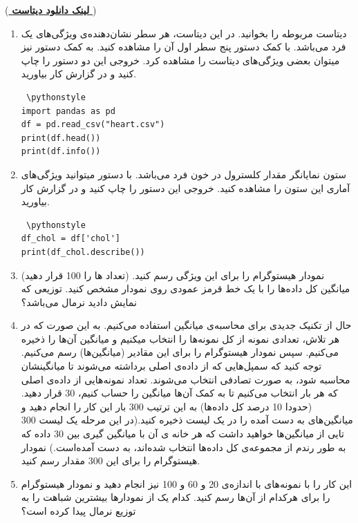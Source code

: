 \documentclass[a4paper]{article}
\begin{document}
(\href{https://drive.google.com/file/d/12Za0y2Xn2-6-b5-XGL5WwF33FZsjRFfq/view?usp=sharing}{ 
 \textbf{	لینک دانلود دیتاست}
})
\begin{enumerate}
	\item 
دیتاست مربوطه را بخوانید.  در این دیتاست، هر سطر نشان‌دهنده‌ی ویژگی‌های یک فرد می‌باشد. با کمک دستور
پنج سطر اول آن را مشاهده کنید. به کمک دستور
نیز میتوان بعضی ویژگی‌های دیتاست را مشاهده کرد. خروجی این دو دستور را چاپ کنید و در گزارش کار بیاورید. 
	\begin{latin}
		\begin{lstlisting} \pythonstyle
import pandas as pd
df = pd.read_csv("heart.csv")
print(df.head())
print(df.info())
		\end{lstlisting}
	\end{latin}
	\item
	ستون
	نمایانگر مقدار کلسترول در خون فرد می‌باشد. با دستور 
	میتوانید ویژگی‌های آماری این ستون را مشاهده کنید. خروجی این دستور را چاپ کنید و در گزارش کار بیاورید.
\begin{latin}
	\begin{lstlisting} \pythonstyle
df_chol = df['chol']
print(df_chol.describe())
	\end{lstlisting}
\end{latin}
\item 
نمودار هیستوگرام را برای این ویژگی رسم کنید. (تعداد 
 ها را  100 قرار دهید) 
میانگین کل داده‌ها را با یک خط قرمز عمودی روی نمودار مشخص کنید. توزیعی که نمایش دادید نرمال می‌باشد؟
\item 
حال از تکنیک جدیدی برای محاسبه‌ی میانگین استفاده می‌کنیم. به این صورت که در هر تلاش، تعدادی نمونه از کل نمونه‌ها را انتخاب میکنیم و میانگین آن‌ها را ذخیره می‌کنیم. سپس نمودار هیستوگرام را برای این مقادیر (میانگین‌ها) رسم می‌کنیم. توجه کنید که سمپل‌هایی که از داده‌ی اصلی برداشته می‌شوند تا میانگینشان محاسبه شود، به صورت تصادفی انتخاب می‌شوند. تعداد نمونه‌هایی از داده‌ی اصلی که هر بار انتخاب می‌کنیم تا به کمک آن‌ها میانگین را حساب کنیم، 30 قرار دهید. (حدودا 10 درصد کل داده‌ها) به این ترتیب  300 بار این کار را انجام دهید و میانگین‌های به دست آمده را در یک لیست ذخیره کنید.(در این مرحله یک لیست  300 تایی از میانگین‌ها خواهید داشت که هر خانه ی آن با میانگین گیری بین  30 داده که به طور رندم از مجموعه‌ی کل داده‌ها انتخاب شده‌اند، به ‌دست آمده‌است.) نمودار هیستوگرام را برای این 300 مقدار رسم کنید.
\item 
این کار را با نمونه‌های با اندازه‌ی  20 و  60 و 100 نیز انجام دهید و نمودار هیستوگرام را برای هرکدام از آن‌ها رسم کنید. کدام یک از نمودار‌ها بیشترین شباهت را به توزیع نرمال پیدا کرده است؟
\end{enumerate}
\end{document}
